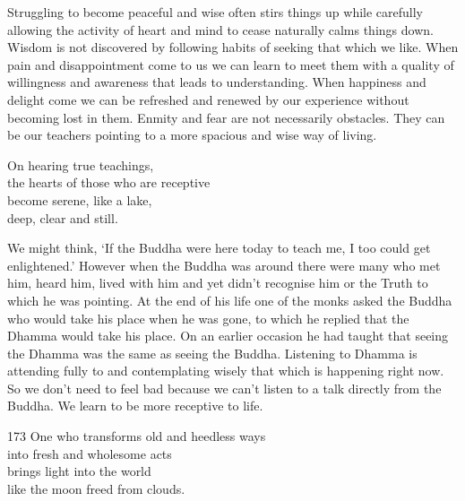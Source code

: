 \begin{dhpRefl}

Struggling to become peaceful and wise often stirs things up while
carefully allowing the activity of heart and mind to cease naturally
calms things down. Wisdom is not discovered by following habits of
seeking that which we like. When pain and disappointment come to us
we can learn to meet them with a quality of willingness and awareness
that leads to understanding. When happiness and delight come we can
be refreshed and renewed by our experience without becoming lost in
them. Enmity and fear are not necessarily obstacles. They can be our
teachers pointing to a more spacious and wise way of living.

\end{dhpRefl}


\begin{dhpVerse}{82}
\label{dhp-82}
On hearing true teachings,\\
the hearts of those who are receptive\\
become serene, like a lake,\\
deep, clear and still.
\end{dhpVerse}

\begin{dhpRefl}

We might think, `If the Buddha were here today to teach me, I too
could get enlightened.' However when the Buddha was around there were
many who met him, heard him, lived with him and yet didn't recognise
him or the Truth to which he was pointing. At the end of his life one
of the monks asked the Buddha who would take his place when he was
gone, to which he replied that the Dhamma would take his place. On an
earlier occasion he had taught that seeing the Dhamma was the same as
seeing the Buddha. Listening to Dhamma is attending fully to and
contemplating wisely that which is happening right now. So we don't
need to feel bad because we can't listen to a talk directly from the
Buddha. We learn to be more receptive to life.

\end{dhpRefl}


\begin{dhpVerse}{173}
\label{dhp-173}
One who transforms old and heedless ways\\
into fresh and wholesome acts\\
brings light into the world\\
like the moon freed from clouds.
\end{dhpVerse}

